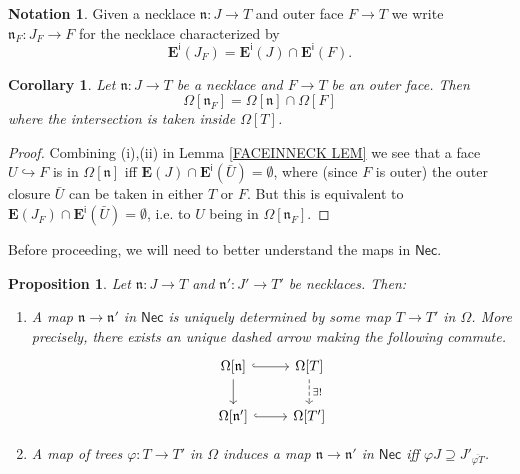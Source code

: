 \documentclass[a4paper,10pt
,draft
]{article}%
\numberwithin{equation}{section}
\numberwithin{figure}{section}
\newtheorem{proposition}[equation]{Proposition}%
\newtheorem{corollary}[equation]{Corollary}%
\theoremstyle{definition} %
\newtheorem{notation}[equation]{Notation}%
\newcommand{\1}{\ensuremath{\mathbbm 1}}%
\begin{document}
\begin{notation}
	Given a necklace
	$\mathfrak{n} \colon J \to T$
	and outer face $F \to T$
	we write 
	$\mathfrak{n}_F \colon J_F \to F$
	for the necklace characterized by
\[
	\boldsymbol{E}^{\mathsf{i}}(J_F)
	=
	\boldsymbol{E}^{\mathsf{i}}(J)
	\cap
	\boldsymbol{E}^{\mathsf{i}}(F).
\]
\end{notation}


\begin{corollary}\label{NECINT COR}
	Let $\mathfrak{n} \colon J \to T$ be a necklace and
	$F \to T$ be an outer face.
	Then
\[
	\Omega[\mathfrak{n}_F] = \Omega[\mathfrak{n}] \cap \Omega[F]
\]
	where the intersection is taken inside
	$\Omega[T]$.
\end{corollary}

\begin{proof}
	Combining (i),(ii) in 
	Lemma \ref{FACEINNECK LEM}
	we see that a face $U \hookrightarrow F$ is
	in $\Omega[\mathfrak{n}]$
	iff $\boldsymbol{E}(J) \cap 
	\boldsymbol{E}^{\mathsf{i}}(\bar{U}) = \emptyset$,
	where (since $F$ is outer) the outer closure $\bar{U}$
	can be taken in either $T$ or $F$.
	But this is equivalent to 
	$\boldsymbol{E}(J_F) \cap 
	\boldsymbol{E}^{\mathsf{i}}(\bar{U}) = \emptyset$,
	i.e. to $U$ being in $\Omega[\mathfrak{n}_F]$.
\end{proof}



Before proceeding, we will need to better understand the maps in 
$\mathsf{Nec}$.





\begin{proposition}\label{MAPNECK PROP}
	Let $\mathfrak{n}\colon J \to T$ and $\mathfrak{n}' \colon J' \to T'$ be necklaces. Then:
\begin{enumerate}
\item[(i)]
	A map $\mathfrak{n} \to \mathfrak{n}'$ in $\mathsf{Nec}$
	is uniquely determined by some map 
	$T \to T'$ in $\Omega$. 
	More precisely, there exists an unique dashed arrow
	making the following commute.
\begin{equation}\label{NECKMAP EQ}
\begin{tikzcd}
	\Omega[\mathfrak{n}] 
	\ar[hookrightarrow]{r} 
	\ar{d}
&
	\Omega[T] 
	\ar[dashed]{d}{\exists !}
\\
	\Omega[\mathfrak{n}']
	\ar[hookrightarrow]{r}
&
	\Omega[T']
	\end{tikzcd}
\end{equation}
\item[(ii)]
	A map of trees 
	$\varphi \colon T \to T'$ in $\Omega$
	induces a map 
	$\mathfrak{n} \to \mathfrak{n}'$ in $\mathsf{Nec}$
	iff
	$\varphi J \supseteq J'_{\overline{\varphi T}}$.
\end{enumerate}
\end{proposition}
\end{document}
